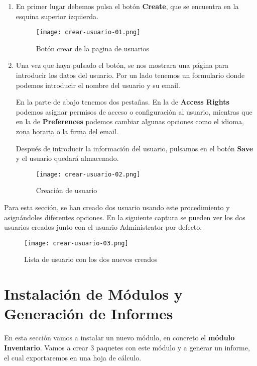 \begin{enumerate}
    \item En primer lugar debemos pulsa el botón \textbf{Create}, que se encuentra en la esquina superior izquierda.

    \begin{figure}[h]
        \centering
        \texttt{[image: crear-usuario-01.png]}
        \caption{Botón crear de la pagina de usuarios}
    \end{figure}

    \item Una vez que haya pulsado el botón, se nos mostrara una página para introducir los datos del usuario. Por un lado tenemos un formulario donde podemos introducir el nombre del usuario y su email.

    En la parte de abajo tenemos dos pestañas. En la de \textbf{Access Rights} podemos asignar permisos de acceso o configuración al usuario, mientras que en la de \textbf{Preferences} podemos cambiar algunas opciones como el idioma, zona horaria o la firma del email.

    Después de introducir la información del usuario, pulsamos en el botón \textbf{Save} y el usuario quedará almacenado.

    \begin{figure}[h]
        \centering
        \texttt{[image: crear-usuario-02.png]}
        \caption{Creación de usuario}
    \end{figure}
\end{enumerate}

Para esta sección, se han creado dos usuario usando este procedimiento y asignándoles diferentes opciones. En la siguiente captura se pueden ver los dos usuarios creados junto con el usuario Administrator por defecto.

\begin{figure}[h]
    \centering
    \texttt{[image: crear-usuario-03.png]}
    \caption{Lista de usuario con los dos nuevos creados}
\end{figure}

\section{Instalación de Módulos y Generación de Informes}
En esta sección vamos a instalar un nuevo módulo, en concreto el \textbf{módulo Inventario}. Vamos a crear 3 paquetes con este módulo y a generar un informe, el cual exportaremos en una hoja de cálculo.

